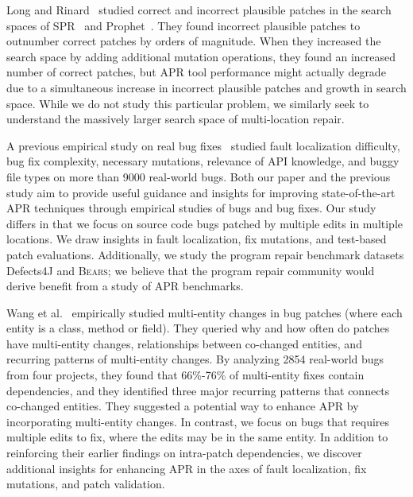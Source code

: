 \documentclass[10pt, conference]{IEEEtran}
\newcommand\bears{\textsc{Bears}\xspace}
\begin{document}
Long and Rinard~\cite{long-search-spaces} studied
correct and incorrect plausible patches in the search spaces of SPR~\cite{spr} 
and Prophet~\cite{prophet}. They found incorrect plausible patches to outnumber 
correct patches by orders of magnitude. When they increased the search space 
by adding additional mutation operations, they found an increased number of 
correct patches, but APR tool performance might actually degrade due to a 
simultaneous increase in incorrect plausible patches and growth in search space.  
While we do not study this particular problem, 
we similarly seek to understand the 
massively larger search space of multi-location repair. 

A previous empirical study on real bug fixes~\cite{zhong2015} 
studied fault localization difficulty, bug fix complexity, necessary
mutations, relevance of API knowledge, and buggy file types
on more than 9000 real-world bugs.  
Both our paper and the previous study aim to provide useful guidance and insights for 
improving state-of-the-art APR techniques through empirical studies of bugs and bug fixes. 
Our study differs in that we focus on 
source code bugs patched by multiple edits in multiple locations. 
We draw insights in fault localization, fix mutations, and test-based 
patch evaluations. Additionally, we study the program repair 
benchmark datasets Defects4J 
and \bears; we believe that the program repair community would derive 
benefit from a study of APR benchmarks.

Wang et al.~\cite{wang2018} empirically studied multi-entity changes in bug patches 
(where each entity is a class, method or field). They queried
why and how often do patches have multi-entity changes, relationships 
between co-changed entities, and recurring patterns of multi-entity changes. 
By analyzing 2854 real-world bugs from four projects, they found that 66\%-76\% of
multi-entity fixes contain dependencies, 
and they identified three major recurring patterns that connects co-changed entities. 
They suggested a potential way to 
enhance APR by incorporating multi-entity changes. In contrast, we focus on bugs that
requires multiple edits to fix, where the edits may be in the same entity. In addition 
to reinforcing their earlier findings on intra-patch dependencies, we discover 
additional insights for enhancing APR in the axes of fault localization, 
fix mutations, and patch validation.
\end{document}
